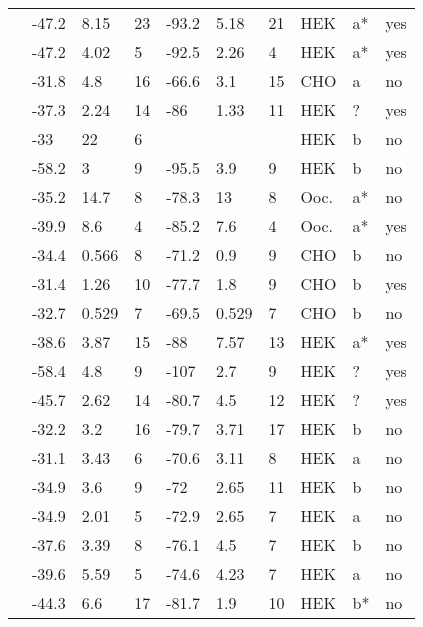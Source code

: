 \begin{footnotesize}
\begin{longtable}{p{5cm}|lll|lll|lll}
\citet{Baroudi2000bMutationDB} & -47.2 & 8.15 & 23 & -93.2 & 5.18 & 21 & HEK & a* & yes \\
\citet{Baroudi2001MutationDB} & -47.2 & 4.02 & 5 & -92.5 & 2.26 & 4 & HEK & a* & yes \\
\citet{Bebarova2008MutationDB} & -31.8 & 4.8 & 16 & -66.6 & 3.1 & 15 & CHO & a & no \\
\citet{Beckermann2014MutationDB} & -37.3 & 2.24 & 14 & -86 & 1.33 & 11 & HEK & ? & yes \\
\citet{Beyder2010MutationDB} & -33 & 22 & 6 & && & HEK & b & no \\
\citet{Beyder2014MutationDB} & -58.2 & 3 & 9 & -95.5 & 3.9 & 9 & HEK & b & no \\
\citet{Bezzina2003MutationDB} & -35.2 & 14.7 & 8 & -78.3 & 13 & 8 & Ooc. & a* & no \\
\citet{Bezzina2003MutationDB} & -39.9 & 8.6 & 4 & -85.2 & 7.6 & 4 & Ooc. & a* & yes \\
\citet{Calloe2011MutationDB} & -34.4 & 0.566 & 8 & -71.2 & 0.9 & 9 & CHO & b & no \\
\citet{Calloe2011MutationDB} & -31.4 & 1.26 & 10 & -77.7 & 1.8 & 9 & CHO & b & yes \\
\citet{Calloe2013MutationDB} & -32.7 & 0.529 & 7 & -69.5 & 0.529 & 7 & CHO & b & no \\
\citet{Casini2007MutationDB} & -38.6 & 3.87 & 15 & -88 & 7.57 & 13 & HEK & a* & yes \\
\citet{Chang2004MutationDB} & -58.4 & 4.8 & 9 & -107 & 2.7 & 9 & HEK & ? & yes \\
\citet{Chen2016MutationDB} & -45.7 & 2.62 & 14 & -80.7 & 4.5 & 12 & HEK & ? & yes \\
\citet{Cheng2010MutationDB} & -32.2 & 3.2 & 16 & -79.7 & 3.71 & 17 & HEK & b & no \\
\citet{Cheng2010MutationDB} & -31.1 & 3.43 & 6 & -70.6 & 3.11 & 8 & HEK & a & no \\
\citet{Cheng2010MutationDB} & -34.9 & 3.6 & 9 & -72 & 2.65 & 11 & HEK & b & no \\
\citet{Cheng2010MutationDB} & -34.9 & 2.01 & 5 & -72.9 & 2.65 & 7 & HEK & a & no \\
\citet{Cheng2011MutationDB} & -37.6 & 3.39 & 8 & -76.1 & 4.5 & 7 & HEK & b & no \\
\citet{Cheng2011MutationDB} & -39.6 & 5.59 & 5 & -74.6 & 4.23 & 7 & HEK & a & no \\
\citet{Clatot2012MutationDB} & -44.3 & 6.6 & 17 & -81.7 & 1.9 & 10 & HEK & b* & no \\

\end{longtable}
\end{footnotesize}
